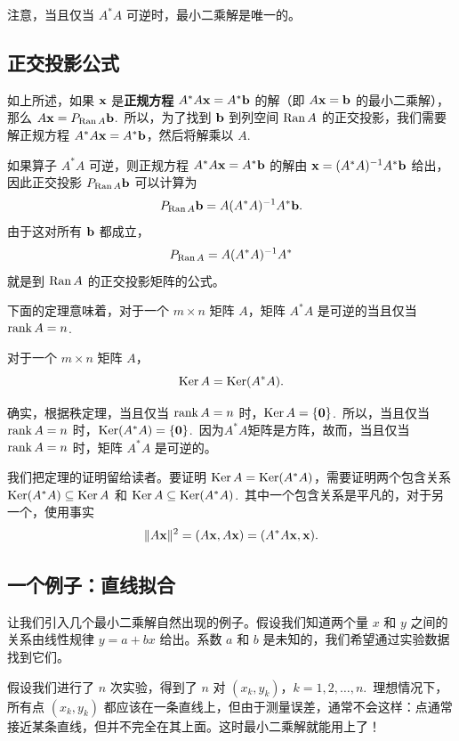 注意，当且仅当 $A^*A$ 可逆时，最小二乘解是唯一的。

\subsection{正交投影公式}\label{sec:05-04-02}

如上所述，如果 $\mathbf{x}$ 是\textbf{正规方程} $A^*A\mathbf{x} = A^*\mathbf{b}$ 的解（即 $A\mathbf{x} = \mathbf{b}$ 的最小二乘解），那么 $A\mathbf{x} = P_{\operatorname{Ran} A} \mathbf{b}$.~所以，为了找到 $\mathbf{b}$ 到列空间 $\operatorname{Ran} A$ 的正交投影，我们需要解正规方程 $A^*A\mathbf{x} = A^*\mathbf{b}$，然后将解乘以 $A$.~

如果算子 $A^*A$ 可逆，则正规方程 $A^*A\mathbf{x} = A^*\mathbf{b}$ 的解由 $\mathbf{x} = (A^*A)^{-1}A^*\mathbf{b}$ 给出，因此正交投影 $P_{\operatorname{Ran} A} \mathbf{b}$ 可以计算为
$$P_{\operatorname{Ran} A} \mathbf{b} = A(A^*A)^{-1}A^*\mathbf{b}.$$
由于这对所有 $\mathbf{b}$ 都成立，
$$P_{\operatorname{Ran} A} = A(A^*A)^{-1}A^*$$
就是到 $\operatorname{Ran} A$ 的正交投影矩阵的公式。

下面的定理意味着，对于一个 $m \times n$ 矩阵 $A$，矩阵 $A^*A$ 是可逆的当且仅当 $\operatorname{rank} A = n$.~

\begin{theorem}\label{stmt:05-04-01} 对于一个 $m \times n$ 矩阵 $A$，
$$\operatorname{Ker} A = \operatorname{Ker}(A^*A).$$\end{theorem}

确实，根据秩定理，当且仅当 $\operatorname{rank} A = n$ 时，$\operatorname{Ker} A = \{\mathbf{0}\}$.~所以，当且仅当 $\operatorname{rank} A = n$ 时，$\operatorname{Ker} (A^*A)= \{\mathbf{0}\}$.~因为$A^*A$矩阵是方阵，故而，当且仅当 $\operatorname{rank} A = n$ 时，矩阵 $A^*A$ 是可逆的。

我们把定理的证明留给读者。要证明 $\operatorname{Ker} A = \operatorname{Ker}(A^*A)$，需要证明两个包含关系 $\operatorname{Ker}(A^*A) \subseteq \operatorname{Ker} A$ 和 $\operatorname{Ker} A \subseteq \operatorname{Ker}(A^*A)$.~其中一个包含关系是平凡的，对于另一个，使用事实
$$\|A\mathbf{x}\|^2 = (A\mathbf{x}, A\mathbf{x}) = (A^*A\mathbf{x}, \mathbf{x}).$$

\subsection{一个例子：直线拟合}\label{sec:05-04-03}

让我们引入几个最小二乘解自然出现的例子。假设我们知道两个量 $x$ 和 $y$ 之间的关系由线性规律 $y = a + bx$ 给出。系数 $a$ 和 $b$ 是未知的，我们希望通过实验数据找到它们。

假设我们进行了 $n$ 次实验，得到了 $n$ 对 $(x_k, y_k)$，$k=1, 2, \dots, n$.~理想情况下，所有点 $(x_k, y_k)$ 都应该在一条直线上，但由于测量误差，通常不会这样：点通常接近某条直线，但并不完全在其上面。这时最小二乘解就能用上了！

